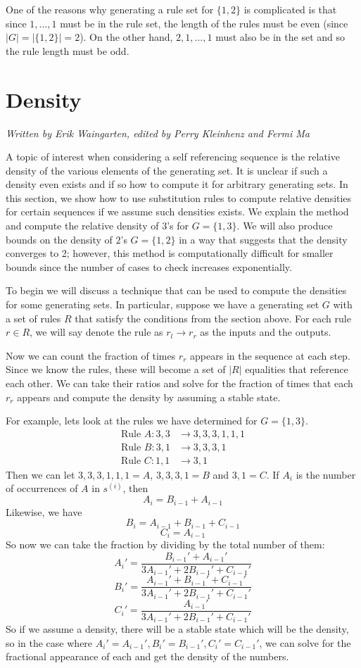 \documentclass[runningheads,a4paper]{llncs}
\begin{document}
One of the reasons why generating a rule set for $\{1, 2\}$ is complicated is that since $1, ..., 1$ must be in the rule set, the length of the rules must be even (since $|G| = |\{1, 2\}| = 2$). On the other hand, $2, 1, ..., 1$ must also be in the set and so the rule length must be odd. 

\section{Density}
\label{density}
\emph{Written by Erik Waingarten, edited by Perry Kleinhenz and Fermi Ma}

A topic of interest when considering a self referencing sequence is the relative density of the various elements of the generating set. It is unclear if such a density even exists and if so how to compute it for arbitrary generating sets. In this section, we show how to use substitution rules to compute relative densities for certain sequences if we assume such densities exists. We explain the method and compute the relative density of 3's for $G = \{ 1, 3\}$. We will also produce bounds on the density of $2$'s $G = \{ 1, 2\}$ in a way that suggests that the density converges to 2; however, this method is computationally difficult for smaller bounds since the number of cases to check increases exponentially. 

To begin we will discuss a technique that can be used to compute the densities for some generating sets. In particular, suppose we have a generating set $G$ with a set of rules $R$ that satisfy the conditions from the section above. For each rule $r \in R$, we will say denote the rule as $r_l \rightarrow r_r$ as the inputs and the outputs. 

Now we can count the fraction of times $r_r$ appears in the sequence at each step. Since we know the rules, these will become a set of $|R|$ equalities that reference each other. We can take their ratios and solve for the fraction of times that each $r_r$ appears and compute the density by assuming a stable state.

For example, lets look at the rules we have determined for $G = \{ 1, 3 \}$. 
\begin{align*}
\text{Rule }A: 3,3 &\to 3,3,3,1,1,1 \\
\text{Rule }B: 3,1 &\to 3,3,3,1\\
\text{Rule }C: 1,1 &\to 3,1
\end{align*}
Then we can let $3,3,3,1,1,1 = A$, $3,3,3,1 = B$ and $3, 1 = C$. If $A_i$ is the number of occurrences of $A$ in $s^{(i)}$, then 
\[ A_i = B_{i-1} + A_{i-1} \]
Likewise, we have
\[ B_i = A_{i-1} + B_{i-1} + C_{i-1} \]
\[ C_i = A_{i-1} \]
So now we can take the fraction by dividing by the total number of them:
\[ A_i' = \dfrac{B_{i-1}' + A_{i-1}'}{3A_{i-1}' + 2B_{i-1}' + C_{i-1}'} \]
\[ B_i' = \dfrac{A_{i-1}' + B_{i-1}' + C_{i-1}'}{3A_{i-1}' + 2B_{i-1}' + C_{i-1}'} \]
\[ C_i' = \dfrac{A_{i-1}'}{3A_{i-1}' + 2B_{i-1}' + C_{i-1}'} \]
So if we assume a density, there will be a stable state which will be the density, so in the case where $A_i'=A_{i-1}', B_i' = B_{i-1}', C_i'=C_{i-1}'$, we can solve for the fractional appearance of each and get the density of the numbers.
\end{document}
